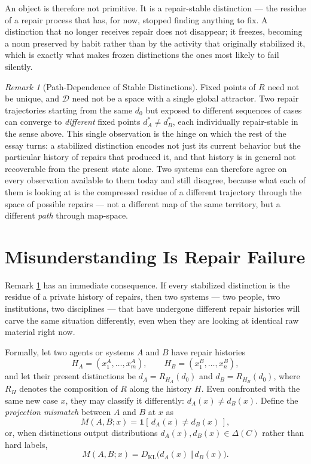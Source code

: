 \documentclass[11pt]{article}
\theoremstyle{plain}
\theoremstyle{definition}
\theoremstyle{remark}
\newtheorem{remark}[theorem]{Remark}
\begin{document}
An object is therefore not primitive. It is a repair-stable distinction --- the residue of a repair process that has, for now, stopped finding anything to fix. A distinction that no longer receives repair does not disappear; it freezes, becoming a noun preserved by habit rather than by the activity that originally stabilized it, which is exactly what makes frozen distinctions the ones most likely to fail silently.

\begin{remark}[Path-Dependence of Stable Distinctions]
\label{rem:path-dependence}
Fixed points of $R$ need not be unique, and $\mathcal{D}$ need not be a space with a single global attractor. Two repair trajectories starting from the same $d_0$ but exposed to different sequences of cases can converge to \emph{different} fixed points $d_A^\ast \ne d_B^\ast$, each individually repair-stable in the sense above. This single observation is the hinge on which the rest of the essay turns: a stabilized distinction encodes not just its current behavior but the particular history of repairs that produced it, and that history is in general not recoverable from the present state alone. Two systems can therefore agree on every observation available to them today and still disagree, because what each of them is looking at is the compressed residue of a different trajectory through the space of possible repairs --- not a different map of the same territory, but a different \emph{path} through map-space.
\end{remark}

\section{Misunderstanding Is Repair Failure}

Remark \ref{rem:path-dependence} has an immediate consequence. If every stabilized distinction is the residue of a private history of repairs, then two systems --- two people, two institutions, two disciplines --- that have undergone different repair histories will carve the same situation differently, even when they are looking at identical raw material right now.

Formally, let two agents or systems $A$ and $B$ have repair histories
\[
H_A = (x_1^A, \dots, x_m^A), \qquad H_B = (x_1^B, \dots, x_n^B),
\]
and let their present distinctions be $d_A = R_{H_A}(d_0)$ and $d_B = R_{H_B}(d_0)$, where $R_H$ denotes the composition of $R$ along the history $H$. Even confronted with the same new case $x$, they may classify it differently: $d_A(x) \ne d_B(x)$. Define the \emph{projection mismatch} between $A$ and $B$ at $x$ as
\[
M(A,B;x) = \mathbf{1}[\,d_A(x) \ne d_B(x)\,],
\]
or, when distinctions output distributions $d_A(x), d_B(x) \in \Delta(C)$ rather than hard labels,
\[
M(A,B;x) = D_{\mathrm{KL}}\big(d_A(x) \,\Vert\, d_B(x)\big).
\]
\end{document}
